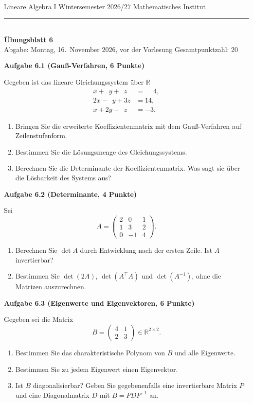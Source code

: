 \documentclass[11pt,a4paper]{article}
\newcommand{\aufgabe}[3]{\bigskip\par\textbf{Aufgabe #1 (#2, #3 Punkte)}\par\nopagebreak\smallskip}
\newcommand{\R}{\mathbb{R}}
\begin{document}
{\small Lineare Algebra I \textperiodcentered{} Wintersemester 2026/27 \hfill Mathematisches Institut}\\[-0.4em]
\rule{\linewidth}{0.6pt}\\[0.5em]
{\Large\bfseries Übungsblatt 6}\\[0.4em]
Abgabe: Montag, 16.\ November 2026, vor der Vorlesung \hfill Gesamtpunktzahl: 20

\aufgabe{6.1}{Gauß-Verfahren}{6}
Gegeben ist das lineare Gleichungssystem über $\R$
\[
\begin{aligned}
  x + \phantom{2}y + \phantom{3}z &= \phantom{-}4,\\
  2x - \phantom{2}y + 3z &= 14,\\
  x + 2y - \phantom{3}z &= -3.
\end{aligned}
\]
\begin{enumerate}
  \item Bringen Sie die erweiterte Koeffizientenmatrix mit dem Gauß-Verfahren auf Zeilenstufenform.
  \item Bestimmen Sie die Lösungsmenge des Gleichungssystems.
  \item Berechnen Sie die Determinante der Koeffizientenmatrix. Was sagt sie über die Lösbarkeit des
        Systems aus?
\end{enumerate}

\aufgabe{6.2}{Determinante}{4}
Sei
\[
A = \begin{pmatrix} 2 & 0 & 1 \\ 1 & 3 & 2 \\ 0 & -1 & 4 \end{pmatrix}.
\]
\begin{enumerate}
  \item Berechnen Sie $\det A$ durch Entwicklung nach der ersten Zeile. Ist $A$ invertierbar?
  \item Bestimmen Sie $\det(2A)$, $\det(A^{\top}A)$ und $\det(A^{-1})$, ohne die Matrizen
        auszurechnen.
\end{enumerate}

\aufgabe{6.3}{Eigenwerte und Eigenvektoren}{6}
Gegeben sei die Matrix
\[
B = \begin{pmatrix} 4 & 1 \\ 2 & 3 \end{pmatrix} \in \R^{2 \times 2}.
\]
\begin{enumerate}
  \item Bestimmen Sie das charakteristische Polynom von $B$ und alle Eigenwerte.
  \item Bestimmen Sie zu jedem Eigenwert einen Eigenvektor.
  \item Ist $B$ diagonalisierbar? Geben Sie gegebenenfalls eine invertierbare Matrix $P$ und eine
        Diagonalmatrix $D$ mit $B = PDP^{-1}$ an.
\end{enumerate}
\end{document}
